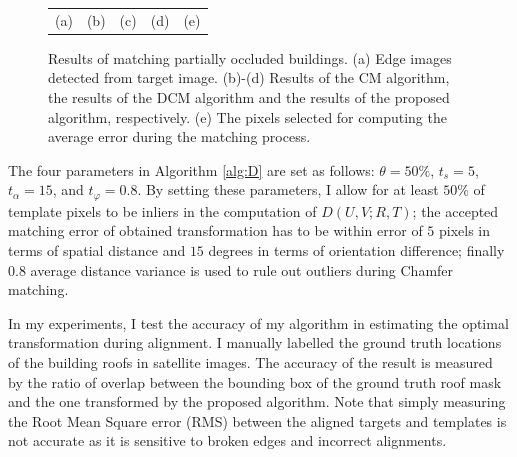 \documentclass{iitthesis}
\begin{document}
\begin{figure}
{\begin{tabular}{ccccc}
  \\
  (a) & (b) & (c) & (d) & (e)
\end{tabular}}
\caption{Results of matching partially occluded buildings. (a) Edge images detected from target image. (b)-(d) Results of the CM algorithm, the results of the DCM algorithm and the results of the proposed algorithm, respectively. (e) The pixels selected for computing the average error during the matching process.}
\label{fig: incomplete building results}
\end{figure} 

The four parameters in Algorithm \ref{alg:D} are set as follows: $\theta=50\%$, $t_s=5$, $t_{\alpha}=15$, and $t_{\varphi}=0.8$. By setting these parameters, I allow for at least $50\%$ of template pixels to be inliers in the computation of $D(U, V;R, T)$; the accepted matching error of obtained transformation has to be within error of $5$ pixels in terms of spatial distance and $15$ degrees in terms of orientation difference; finally $0.8$ average distance variance is used to rule out outliers during Chamfer matching.

In my experiments, I test the accuracy of my algorithm in estimating the optimal transformation during alignment. I manually labelled the ground truth locations of the building roofs in satellite images. The accuracy of the result is measured by the ratio of overlap between the bounding box of the ground truth roof mask and the one transformed by the proposed algorithm. Note that simply measuring the Root Mean Square error (RMS) between the aligned targets and templates is not accurate as it  is sensitive to broken edges and incorrect alignments.
\end{document}
